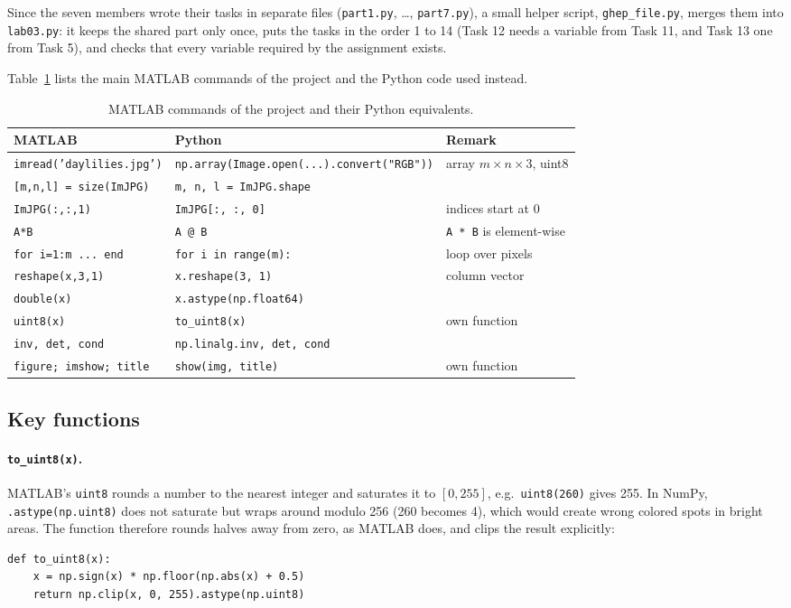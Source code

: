 Since the seven members wrote their tasks in separate files
(\texttt{part1.py}, \dots, \texttt{part7.py}), a small helper script,
\texttt{ghep\_file.py}, merges them into \texttt{lab03.py}: it keeps the shared
part only once, puts the tasks in the order 1 to 14 (Task 12 needs a variable
from Task 11, and Task 13 one from Task 5), and checks that every variable
required by the assignment exists.

Table~\ref{tab:matlab-python} lists the main MATLAB commands of the project
and the Python code used instead.

\begin{table}[H]\centering\small
\caption{MATLAB commands of the project and their Python equivalents.}
\label{tab:matlab-python}
\begin{tabular}{lll}
\toprule
MATLAB & Python & Remark \\
\midrule
\texttt{imread('daylilies.jpg')} & \texttt{np.array(Image.open(...).convert("RGB"))} & array $m\times n\times 3$, uint8 \\
\texttt{[m,n,l] = size(ImJPG)} & \texttt{m, n, l = ImJPG.shape} & \\
\texttt{ImJPG(:,:,1)} & \texttt{ImJPG[:, :, 0]} & indices start at 0 \\
\texttt{A*B} & \texttt{A @ B} & \texttt{A * B} is element-wise \\
\texttt{for i=1:m ... end} & \texttt{for i in range(m):} & loop over pixels \\
\texttt{reshape(x,3,1)} & \texttt{x.reshape(3, 1)} & column vector \\
\texttt{double(x)} & \texttt{x.astype(np.float64)} & \\
\texttt{uint8(x)} & \texttt{to\_uint8(x)} & own function \\
\texttt{inv, det, cond} & \texttt{np.linalg.inv, det, cond} & \\
\texttt{figure; imshow; title} & \texttt{show(img, title)} & own function \\
\bottomrule
\end{tabular}
\end{table}

\subsection{Key functions}

\paragraph{\texttt{to\_uint8(x)}.}
MATLAB's \texttt{uint8} rounds a number to the nearest integer and saturates
it to $[0,255]$, e.g.\ \texttt{uint8(260)} gives 255. In NumPy,
\texttt{.astype(np.uint8)} does not saturate but wraps around modulo 256
(260 becomes 4), which would create wrong colored spots in bright areas.
The function therefore rounds halves away from zero, as MATLAB does, and
clips the result explicitly:
\begin{lstlisting}
def to_uint8(x):
    x = np.sign(x) * np.floor(np.abs(x) + 0.5)
    return np.clip(x, 0, 255).astype(np.uint8)
\end{lstlisting}

